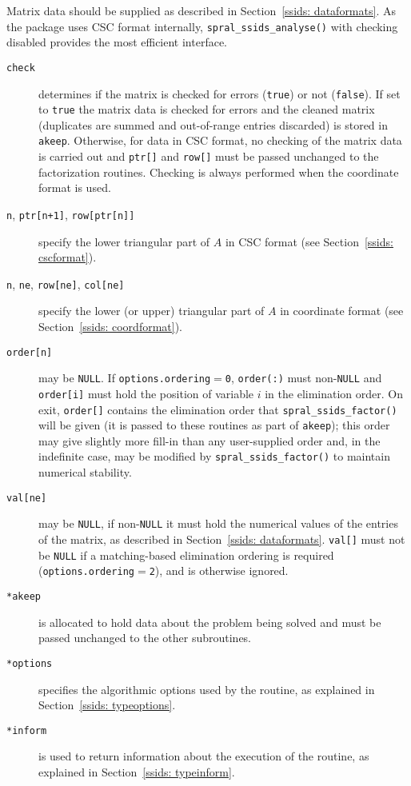 \noindent
Matrix data should be supplied as described in Section~\ref{ssids: dataformats}. As
the package uses CSC format internally, \texttt{spral\_ssids\_analyse()} with checking
disabled provides the most efficient interface.

\noindent
\begin{description}

\item[\texttt{check}] determines if the matrix is checked for errors
   (\texttt{true}) or not (\texttt{false}). If set to {\tt true} the matrix
   data is checked for errors and the cleaned matrix (duplicates are summed and
   out-of-range entries discarded) is stored in {\tt akeep}.
   Otherwise, for data in CSC format, no checking of the matrix data is carried
   out and {\tt ptr[]} and {\tt row[]} must be passed unchanged to the
   factorization routines. 
   Checking is always performed when the coordinate format is used.

\item[\texttt{n}{\rm ,} \texttt{ptr[n+1]}{\rm ,} \texttt{row[ptr[n]]}] specify the lower
   triangular part of $A$ in CSC format (see Section~\ref{ssids: cscformat}).

\item[\texttt{n}{\rm ,} \texttt{ne}{\rm ,} \texttt{row[ne]}{\rm ,} \texttt{col[ne]}]
   specify the lower (or upper) triangular part of $A$ in coordinate format
   (see Section~\ref{ssids: coordformat}).

\item[\texttt{order[n]}] may be \texttt{NULL}. If {\tt options.ordering}$=${\tt 0},
   {\tt order(:)} must non-\texttt{NULL} and {\tt order[i]} must hold the
   position of variable $i$ in the elimination order. On exit, {\tt order[]}
   contains the elimination order that {\tt spral\_ssids\_factor()} will be given (it
   is passed to these routines as part of {\tt *akeep}); this order may give
   slightly more fill-in than any user-supplied order and, in the indefinite
   case, may be modified by {\tt spral\_ssids\_factor()} to maintain numerical
   stability. 

\item[\texttt{val[ne]}] may be \texttt{NULL}, if non-\texttt{NULL} it must hold
   the numerical values of the entries of the matrix, as described in
   Section~\ref{ssids: dataformats}.
   {\tt val[]} must not be \texttt{NULL} if a matching-based elimination
   ordering is required ({\tt options.ordering$=$2}), and is otherwise ignored.

\item[\texttt{*akeep}] is allocated to hold data about the problem being
   solved and must be passed unchanged to the other subroutines.

\item[\texttt{*options}] specifies the algorithmic options used by the
   routine, as explained in Section~\ref{ssids: typeoptions}.

\item[\texttt{*inform}] is used to return information about the execution
   of the routine, as explained in Section~\ref{ssids: typeinform}.

\end{description}


